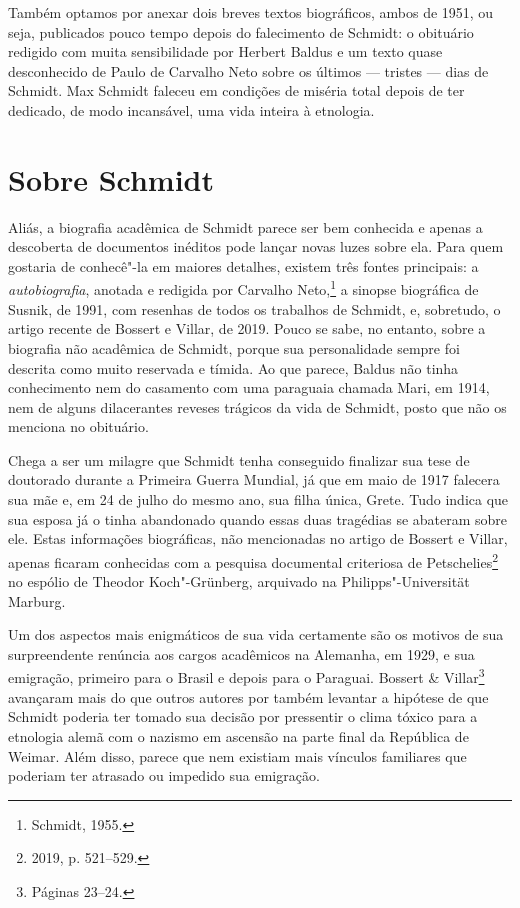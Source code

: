 Também optamos por anexar dois breves textos biográficos, ambos de
1951, ou seja, publicados pouco tempo depois do falecimento de Schmidt:
o obituário redigido com muita sensibilidade por Herbert Baldus e um
texto quase desconhecido de Paulo de Carvalho Neto sobre os últimos ---
tristes --- dias de Schmidt. Max Schmidt faleceu em condições de miséria
total depois de ter dedicado, de modo incansável, uma vida inteira à
etnologia.

\section{Sobre Schmidt}

Aliás, a biografia acadêmica de Schmidt parece ser bem %
conhecida e apenas a descoberta de documentos inéditos pode lançar novas luzes sobre
ela. Para quem gostaria de conhecê"-la em maiores detalhes, existem três
fontes principais: a \textit{autobiografia}, anotada e redigida por Carvalho
Neto,\footnote{Schmidt, 1955.} a sinopse biográfica de Susnik, de 1991, com
resenhas de todos os trabalhos de Schmidt, e, sobretudo, o artigo
recente de Bossert e Villar, de 2019. Pouco se sabe, no entanto, sobre a
biografia não acadêmica de Schmidt, porque sua personalidade sempre foi
descrita como muito reservada e tímida. Ao que parece, Baldus não tinha
conhecimento nem do casamento com uma paraguaia chamada Mari, em 1914,
nem de alguns dilacerantes reveses trágicos da vida de Schmidt, posto que
não os menciona no obituário.

Chega a ser um milagre que Schmidt tenha conseguido finalizar sua tese de
doutorado durante a Primeira Guerra Mundial, já que em maio de 1917
falecera sua mãe e, em 24 de julho do mesmo ano, sua filha única, Grete.
Tudo indica que sua esposa já o tinha abandonado quando essas duas
tragédias se abateram sobre ele. Estas informações biográficas, não
mencionadas no artigo de Bossert e Villar, apenas ficaram
conhecidas com a pesquisa documental criteriosa de Petschelies\footnote{2019, p.
521--529.} no espólio de Theodor Koch"-Grünberg, arquivado na
Philipps"-Universität Marburg.

Um dos aspectos mais enigmáticos de sua vida certamente são os motivos
de sua surpreendente renúncia aos cargos acadêmicos na Alemanha, em
1929, e sua emigração, primeiro para o Brasil e depois para o Paraguai.
Bossert \& Villar\footnote{Páginas 23--24.} avançaram mais do que outros autores
por também levantar a hipótese de que Schmidt poderia ter tomado sua
decisão por pressentir o clima tóxico para a etnologia alemã com o
nazismo em ascensão na parte final da República de Weimar. Além disso,
parece que nem existiam mais vínculos familiares que poderiam ter
atrasado ou impedido sua emigração.

